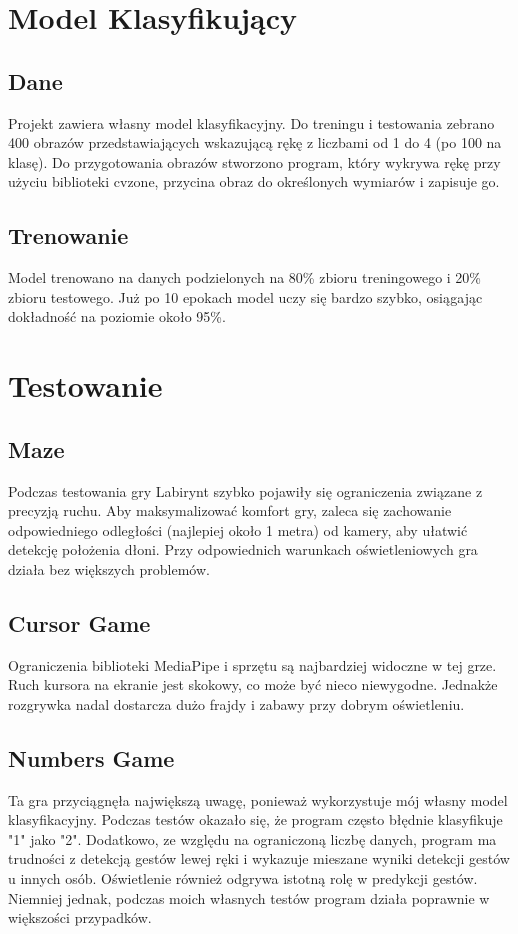\documentclass{article}
\begin{document}
\section{Model Klasyfikujący}
\subsection{Dane}
Projekt zawiera własny model klasyfikacyjny. Do treningu i testowania zebrano 400 obrazów przedstawiających wskazującą rękę z liczbami od 1 do 4 (po 100 na klasę). Do przygotowania obrazów stworzono program, który wykrywa rękę przy użyciu biblioteki cvzone, przycina obraz do określonych wymiarów i zapisuje go.

\subsection{Trenowanie}
Model trenowano na danych podzielonych na 80\% zbioru treningowego i 20\% zbioru testowego. Już po 10 epokach model uczy się bardzo szybko, osiągając dokładność na poziomie około 95\%.

\section{Testowanie}
\subsection{Maze}
Podczas testowania gry Labirynt szybko pojawiły się ograniczenia związane z precyzją ruchu. Aby maksymalizować komfort gry, zaleca się zachowanie odpowiedniego odległości (najlepiej około 1 metra) od kamery, aby ułatwić detekcję położenia dłoni. Przy odpowiednich warunkach oświetleniowych gra działa bez większych problemów.

\subsection{Cursor Game}
Ograniczenia biblioteki MediaPipe i sprzętu są najbardziej widoczne w tej grze. Ruch kursora na ekranie jest skokowy, co może być nieco niewygodne. Jednakże rozgrywka nadal dostarcza dużo frajdy i zabawy przy dobrym oświetleniu.

\subsection{Numbers Game}
Ta gra przyciągnęła największą uwagę, ponieważ wykorzystuje mój własny model klasyfikacyjny. Podczas testów okazało się, że program często błędnie klasyfikuje "1" jako "2". Dodatkowo, ze względu na ograniczoną liczbę danych, program ma trudności z detekcją gestów lewej ręki i wykazuje mieszane wyniki detekcji gestów u innych osób. Oświetlenie również odgrywa istotną rolę w predykcji gestów. Niemniej jednak, podczas moich własnych testów program działa poprawnie w większości przypadków.
\end{document}
